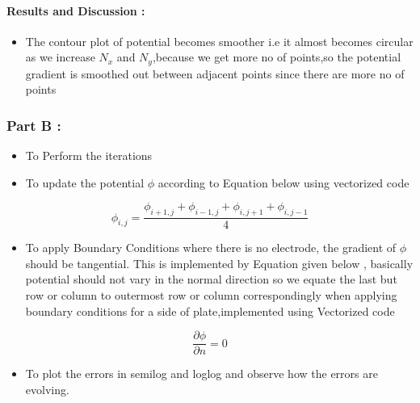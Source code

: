 \documentclass[11pt, a4paper, twoside]{article}
\begin{document}
   \paragraph{Results and Discussion :}\label{results-and-discussion1}

   \begin{itemize}
   \item
     The contour plot of potential becomes smoother i.e it almost becomes
     circular as we increase \(N_x\) and \(N_y\),because we get more no of
     points,so the potential gradient is smoothed out between adjacent
     points since there are more no of points
   \end{itemize}
   
   \subsubsection{Part B :}\label{part-b}

   \begin{itemize}
   \item
     To Perform the iterations
   \item
     To update the potential \(\phi\) according to Equation below using
     vectorized code
   \end{itemize}
   
   \begin{equation}
           \phi_{i,j} = \frac{\phi_{i+1,j} + \phi_{i-1,j} + \phi_{i,j+1} + \phi_{i,j-1}}{4} 
   \end{equation}
   
   \begin{itemize}
   \item
     To apply Boundary Conditions where there is no electrode, the gradient
     of \(\phi\) should be tangential. This is implemented by Equation
     given below , basically potential should not vary in the normal
     direction so we equate the last but row or column to outermost row or
     column correspondingly when applying boundary conditions for a side of
     plate,implemented using Vectorized code
   \end{itemize}
   
   \begin{equation}
    \frac{\partial \phi}{\partial n} = 0
   \end{equation}
   
   \begin{itemize}
   \item
     To plot the errors in semilog and loglog and observe how the errors
     are evolving.
   \end{itemize}
\end{document}

